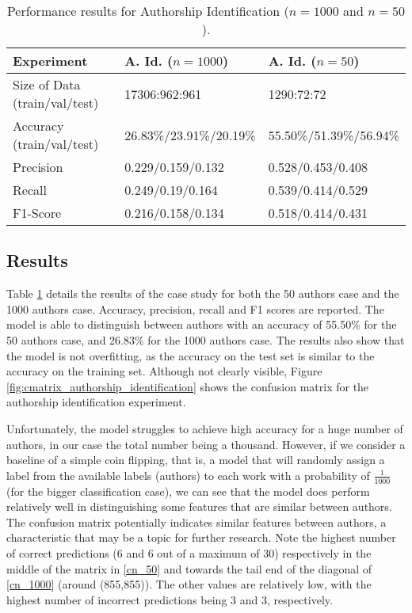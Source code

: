 \begin{table}[htbp]
    \centering
    \begin{tabular}{lll}
    \toprule
    Experiment & A. Id. ($n=1000$) & A. Id. ($n=50$) \\
    \midrule
    Size of Data (train/val/test) & 17306:962:961 & 1290:72:72 \\
    Accuracy (train/val/test) & 26.83\%/23.91\%/20.19\% &  55.50\%/51.39\%/56.94\% \\
    Precision & 0.229/0.159/0.132  & 0.528/0.453/0.408 \\
    Recall & 0.249/0.19/0.164 & 0.539/0.414/0.529 \\
    F1-Score & 0.216/0.158/0.134 & 0.518/0.414/0.431 \\
    \bottomrule
    \end{tabular}
         
    \caption{Performance results for Authorship Identification ($n=1000$ and $n=50$).} 
    \label{tab:authorship_identification}
\end{table}

\subsection*{Results}
Table \ref{tab:authorship_identification} details the results of the case study for both the 50 authors case and the 1000 authors case. Accuracy, precision, recall and F1 scores are reported. The model is able to distinguish between authors with an accuracy of 55.50\% for the 50 authors case, and 26.83\% for the 1000 authors case. The results also show that the model is not overfitting, as the accuracy on the test set is similar to the accuracy on the training set. Although not clearly visible, Figure \ref{fig:cmatrix_authorship_identification} shows the confusion matrix for the authorship identification experiment. 

Unfortunately, the model struggles to achieve high accuracy for a huge number of authors, in our case the total number being a thousand. However, if we consider a baseline of a simple coin flipping, that is, a model that will randomly assign a label from the available labels (authors) to each work with a probability of $\frac{1}{1000}$ (for the bigger classification case), we can see that the model does perform relatively well in distinguishing some features that are similar between authors. The confusion matrix potentially indicates similar features between authors, a characteristic that may be a topic for further research. Note the highest number of correct predictions (6 and 6 out of a maximum of 30) respectively in the middle of the matrix in \ref{cn_50} and towards the tail end of the diagonal of \ref{cn_1000} (around (855,855)). The other values are relatively low, with the highest number of incorrect predictions being 3 and 3, respectively. 

